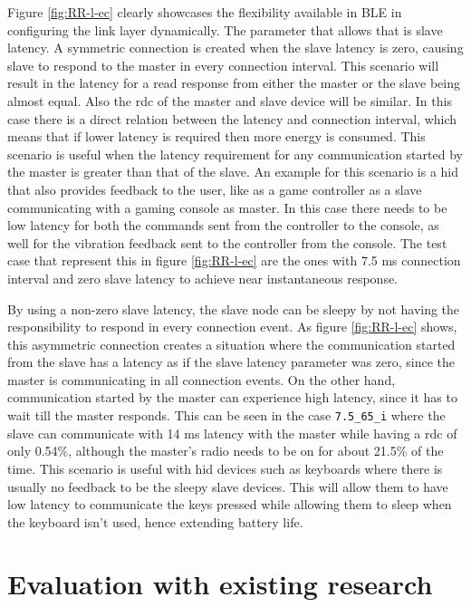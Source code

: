 Figure \ref{fig:RR-l-ec} clearly showcases the flexibility available in BLE in configuring the link layer dynamically. The parameter that allows that is slave latency. A symmetric connection is created when the slave latency is zero, causing slave to respond to the master in every connection interval. This scenario will result in the latency for a read response from either the master or the slave being almost equal. Also the \gls{rdc} of the master and slave device will be similar. In this case there is a direct relation between the latency and connection interval, which means that if lower latency is required then more energy is consumed. This scenario is useful when the latency requirement for any communication started by the master is greater than that of the slave. An example for this scenario is a \gls{hid} that also provides feedback to the user, like as a game controller as a slave communicating with a gaming console as master. In this case there needs to be low latency for both the commands sent from the controller to the console, as well for the vibration feedback sent to the controller from the console. The test case that represent this in figure \ref{fig:RR-l-ec} are the ones with 7.5 ms connection interval and zero slave latency to achieve near instantaneous response.

By using a non-zero slave latency, the slave node can be sleepy by not having the responsibility to respond in every connection event. As figure \ref{fig:RR-l-ec} shows, this asymmetric connection creates a situation where the communication started from the slave has a latency as if the slave latency parameter was zero, since the master is communicating in all connection events. On the other hand, communication started by the master can experience high latency, since it has to wait till the master responds. This can be seen in the case \texttt{7.5\_65\_i} where the slave can communicate with 14 ms latency with the master while having a \gls{rdc} of only 0.54\%, although the master's radio needs to be on for about 21.5\% of the time. This scenario is useful with \gls{hid} devices such as keyboards where there is usually no feedback to be the sleepy slave devices. This will allow them to have low latency to communicate the keys pressed while allowing them to sleep when the keyboard isn't used, hence extending battery life.

\section{Evaluation with existing research}
